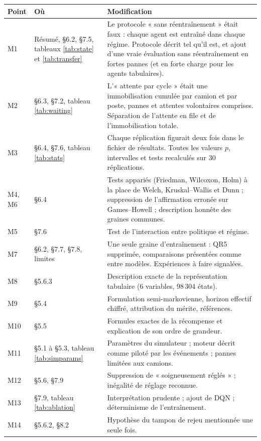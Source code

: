 \documentclass[11pt,a4paper]{article}
\begin{document}
\footnotesize
\begin{longtable}{p{2.2cm}p{4.3cm}p{8.6cm}}
\toprule
\textbf{Point} & \textbf{Où} & \textbf{Modification} \\
\midrule
\endhead
M1 & Résumé, §6.2, §7.5, tableaux \ref{tab:state} et \ref{tab:transfer} & Le protocole « sans réentraînement » était faux : chaque agent est entraîné dans chaque régime. Protocole décrit tel qu'il est, et ajout d'une vraie évaluation sans réentraînement en fortes pannes (et en forte charge pour les agents tabulaires). \\
M2 & §6.3, §7.2, tableau \ref{tab:waiting} & L'« attente par cycle » était une immobilisation cumulée par camion et par poste, pannes et attentes volontaires comprises. Séparation de l'attente en file et de l'immobilisation totale. \\
M3 & §6.4, §7.6, tableau \ref{tab:stats} & Chaque réplication figurait deux fois dans le fichier de résultats. Toutes les valeurs $p$, intervalles et tests recalculés sur 30 réplications. \\
M4, M6 & §6.4 & Tests appariés (Friedman, Wilcoxon, Holm) à la place de Welch, Kruskal--Wallis et Dunn ; suppression de l'affirmation erronée sur Games--Howell ; description honnête des graines communes. \\
M5 & §7.6 & Test de l'interaction entre politique et régime. \\
M7 & §6.2, §7.7, §7.8, limites & Une seule graine d'entraînement : QR5 supprimée, comparaisons présentées comme entre modèles. Expériences à faire signalées. \\
M8 & §5.6.3 & Description exacte de la représentation tabulaire (6 variables, 98\,304 états). \\
M9 & §5.4 & Formulation semi-markovienne, horizon effectif chiffré, attribution du mérite, références. \\
M10 & §5.5 & Formules exactes de la récompense et explication de son ordre de grandeur. \\
M11 & §5.1 à §5.3, tableau \ref{tab:simparams} & Paramètres du simulateur ; moteur décrit comme piloté par les événements ; pannes limitées aux camions. \\
M12 & §5.6, §7.9 & Suppression de « soigneusement réglés » ; inégalité de réglage reconnue. \\
M13 & §7.9, tableau \ref{tab:ablation} & Interprétation prudente ; ajout de DQN ; déterminisme de l'entraînement. \\
M14 & §5.6.2, §8.2 & Hypothèse du tampon de rejeu mentionnée une seule fois. \\

\end{longtable}
\end{document}
